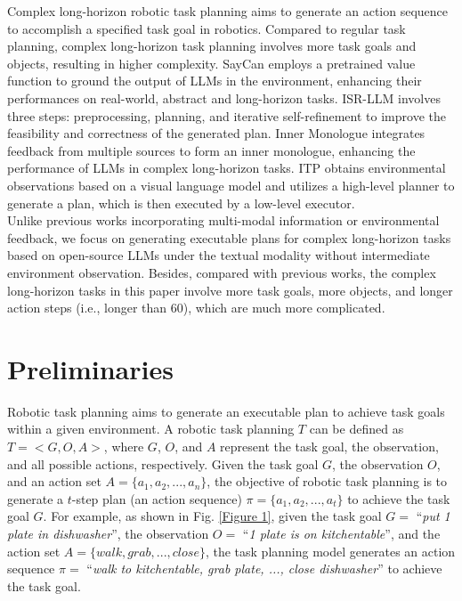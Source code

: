 Complex long-horizon robotic task planning aims to generate an action sequence to accomplish a specified task goal in robotics. Compared to regular task planning, complex long-horizon task planning involves more task goals and objects, resulting in higher complexity. SayCan \cite{DBLP:conf/corl/IchterBCFHHHIIJ22} employs a pretrained value function to ground the output of LLMs in the environment, enhancing their performances on real-world, abstract and long-horizon tasks. ISR-LLM \cite{DBLP:journals/corr/abs-2308-13724} involves three steps: preprocessing, planning, and iterative self-refinement to improve the feasibility and correctness of the generated plan. Inner Monologue \cite{DBLP:conf/corl/HuangXXCLFZTMCS22} integrates feedback from multiple sources to form an inner monologue, enhancing the performance of LLMs in complex long-horizon tasks. ITP \cite{DBLP:journals/corr/abs-2310-10645} obtains environmental observations based on a visual language model and utilizes a high-level planner to generate a plan, which is then executed by a low-level executor.\\
\indent Unlike previous works incorporating multi-modal information or environmental feedback, we focus on generating executable plans for complex long-horizon tasks based on open-source LLMs under the textual modality without intermediate environment observation. Besides, compared with previous works, the complex long-horizon tasks in this paper involve more task goals, more objects, and longer action steps (i.e., longer than 60), which are much more complicated.

\section{Preliminaries}

Robotic task planning aims to generate an executable plan to achieve task goals within a given environment. A robotic task planning $T$ can be defined as $T=<G, O, A>$, where $G$, $O$, and $A$ represent the task goal, the observation, and all possible actions, respectively. Given the task goal $G$, the observation $O$, and an action set $A = \{a_1, a_2, ..., a_n\}$, the objective of robotic task planning is to generate a $t$-step plan (an action sequence) $\pi = \{a_1, a_2, ..., a_t\}$ to achieve the task goal $G$. For example, as shown in Fig. \ref{Figure 1}, given the task goal $G=$ ``\textit{put 1 plate in dishwasher}'', the observation $O=$ ``\textit{1 plate is on kitchentable}'', and the action set $A=\{walk, grab,... ,close\}$, the task planning model generates an action sequence $\pi=$ ``\textit{walk to kitchentable, grab plate, ..., close dishwasher}'' to achieve the task goal.

